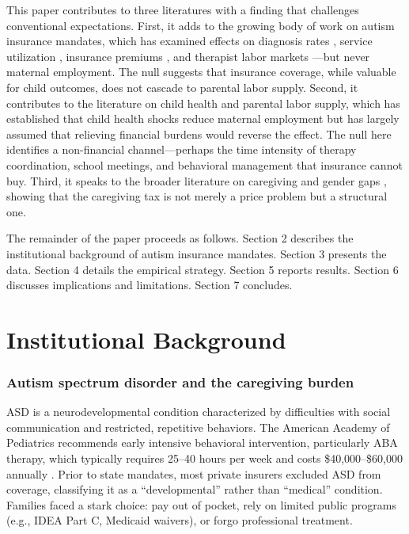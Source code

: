 \documentclass[12pt]{article}
\begin{document}
This paper contributes to three literatures with a finding that challenges conventional expectations. First, it adds to the growing body of work on autism insurance mandates, which has examined effects on diagnosis rates \citep{mandell2016}, service utilization \citep{barry2017}, insurance premiums \citep{chatterji2015}, and therapist labor markets \citep{basu2023}---but never maternal employment. The null suggests that insurance coverage, while valuable for child outcomes, does not cascade to parental labor supply. Second, it contributes to the literature on child health and parental labor supply, which has established that child health shocks reduce maternal employment \citep{powers2003, kuhlthau2005, corman2005} but has largely assumed that relieving financial burdens would reverse the effect. The null here identifies a non-financial channel---perhaps the time intensity of therapy coordination, school meetings, and behavioral management that insurance cannot buy. Third, it speaks to the broader literature on caregiving and gender gaps \citep{blau2017, goldin2014}, showing that the caregiving tax is not merely a price problem but a structural one.

The remainder of the paper proceeds as follows. Section 2 describes the institutional background of autism insurance mandates. Section 3 presents the data. Section 4 details the empirical strategy. Section 5 reports results. Section 6 discusses implications and limitations. Section 7 concludes.


\section{Institutional Background}

\subsubsection*{Autism spectrum disorder and the caregiving burden}  ASD is a neurodevelopmental condition characterized by difficulties with social communication and restricted, repetitive behaviors. The American Academy of Pediatrics recommends early intensive behavioral intervention, particularly ABA therapy, which typically requires 25--40 hours per week and costs \$40,000--\$60,000 annually \citep{shimabukuro2008}. Prior to state mandates, most private insurers excluded ASD from coverage, classifying it as a ``developmental'' rather than ``medical'' condition. Families faced a stark choice: pay out of pocket, rely on limited public programs (e.g., IDEA Part C, Medicaid waivers), or forgo professional treatment.
\end{document}
